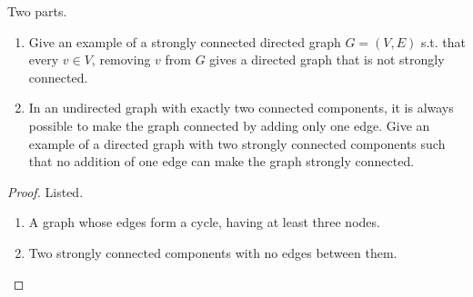   \begin{exercise}
    Two parts. 
    \begin{enumerate}
      \item Give an example of a strongly connected directed graph $G = (V, E)$ s.t. that every $v \in V$, removing $v$ from $G$ gives a directed graph that is not strongly connected. 
      \item In an undirected graph with exactly two connected components, it is always possible to make the graph connected by adding only one edge. Give an example of a directed graph with two strongly connected components such that no addition of one edge can make the graph strongly connected.
    \end{enumerate}
  \end{exercise}
  \begin{proof}
    Listed. 
    \begin{enumerate}
      \item A graph whose edges form a cycle, having at least three nodes.
      \item Two strongly connected components with no edges between them.
    \end{enumerate}
  \end{proof} 

